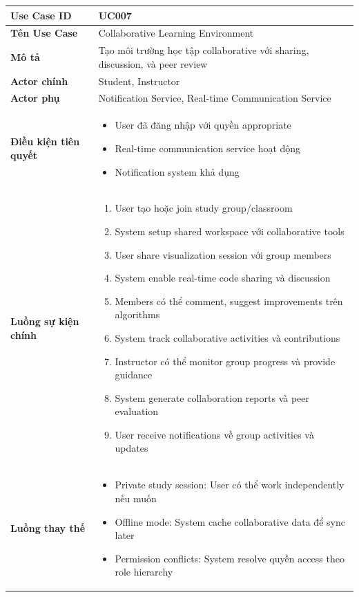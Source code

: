 \begin{longtable}{|p{4cm}|p{10cm}|}
\hline
\textbf{Use Case ID} & UC007 \\ \hline
\textbf{Tên Use Case} & Collaborative Learning Environment \\ \hline
\textbf{Mô tả} & Tạo môi trường học tập collaborative với sharing, discussion, và peer review \\ \hline
\textbf{Actor chính} & Student, Instructor \\ \hline
\textbf{Actor phụ} & Notification Service, Real-time Communication Service \\ \hline
\textbf{Điều kiện tiên quyết} & 
\begin{itemize}
    \item User đã đăng nhập với quyền appropriate
    \item Real-time communication service hoạt động
    \item Notification system khả dụng
\end{itemize} \\ \hline
\textbf{Luồng sự kiện chính} & 
\begin{enumerate}
    \item User tạo hoặc join study group/classroom
    \item System setup shared workspace với collaborative tools
    \item User share visualization session với group members
    \item System enable real-time code sharing và discussion
    \item Members có thể comment, suggest improvements trên algorithms
    \item System track collaborative activities và contributions
    \item Instructor có thể monitor group progress và provide guidance
    \item System generate collaboration reports và peer evaluation
    \item User receive notifications về group activities và updates
\end{enumerate} \\ \hline
\textbf{Luồng thay thế} & 
\begin{itemize}
    \item Private study session: User có thể work independently nếu muốn
    \item Offline mode: System cache collaborative data để sync later
    \item Permission conflicts: System resolve quyền access theo role hierarchy

\end{itemize}
\end{longtable}
